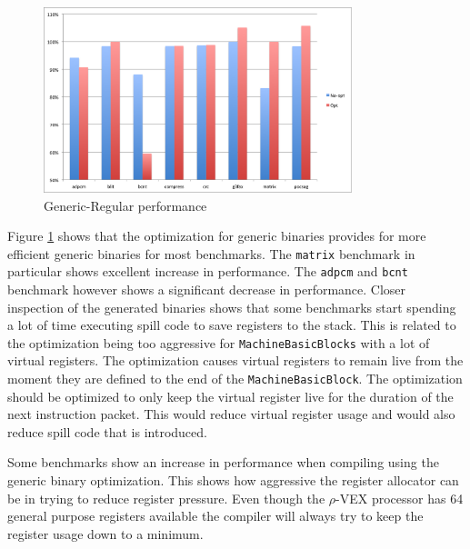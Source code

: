 \begin{figure}[ht]
\centering
\includegraphics[width=0.8\textwidth]{5_results/img/rel_gen.png}
\caption{Generic-Regular performance}
\label{fig:rel_gen}
\end{figure}

Figure \ref{fig:rel_gen} shows that the optimization for generic binaries provides for more efficient generic binaries for most benchmarks. The \texttt{matrix} benchmark in particular shows excellent increase in performance. The \texttt{adpcm} and \texttt{bcnt} benchmark however shows a significant decrease in performance. Closer inspection of the generated binaries shows that some benchmarks start spending a lot of time executing spill code to save registers to the stack. This is related to the optimization being too aggressive for \texttt{MachineBasicBlocks} with a lot of virtual registers. The optimization causes virtual registers to remain live from the moment they are defined to the end of the \texttt{MachineBasicBlock}. The optimization should be optimized to only keep the virtual register live for the duration of the next instruction packet. This would reduce virtual register usage and would also reduce spill code that is introduced.

Some benchmarks show an increase in performance when compiling using the generic binary optimization. This shows how aggressive the register allocator can be in trying to reduce register pressure. Even though the $\rho$-VEX processor has 64 general purpose registers available the compiler will always try to keep the register usage down to a minimum.  

